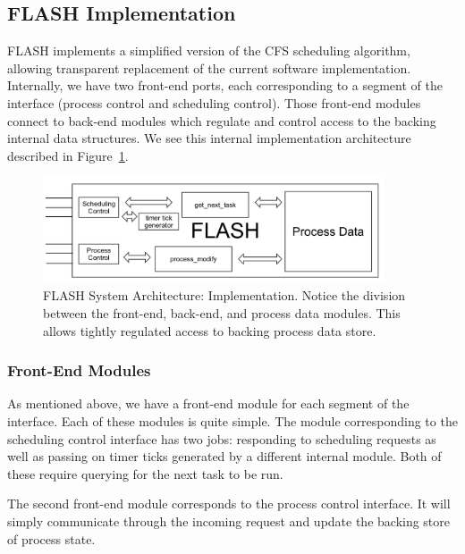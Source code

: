 \documentclass{sig-alternate-10pt}
\begin{document}
\subsection{FLASH Implementation}
\label{sec:FLASH_impl}
FLASH implements a simplified version of the CFS scheduling algorithm, allowing transparent
replacement of the current software implementation.  Internally, we have two
front-end ports, each corresponding to a segment of the interface (process
control and scheduling control). Those front-end modules connect to back-end
modules which regulate and control access to the backing internal data
structures.  We see this internal implementation architecture described in
Figure~\ref{fig:impl_overview}.

\begin{figure}
	\begin{center}
		\includegraphics[width=0.9\textwidth]{fig/flash-impl.png}
		\caption{
			FLASH System Architecture: Implementation.  Notice the division
			between the front-end, back-end, and process data modules.  This
			allows tightly regulated access to backing process data store.
		}
		\label{fig:impl_overview}
	\end{center}
\end{figure}

\subsubsection{Front-End Modules}
As mentioned above, we have a front-end module for each segment of the
interface.  Each of these modules is quite simple.  The module corresponding
to the scheduling control interface has two jobs: responding to scheduling requests
as well as passing on timer ticks generated by a different internal module.
Both of these require querying for the next task to be run.

The second front-end module corresponds to the process control interface.
It will simply communicate through the incoming request and update the
backing store of process state.
\end{document}
